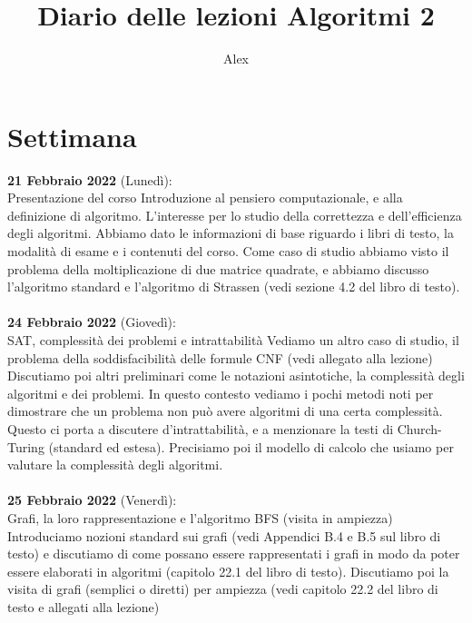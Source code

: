 \documentclass{article}
\title{Diario delle lezioni Algoritmi 2}
\author{Alex}
\begin{document}
\maketitle

\section{Settimana}

\textbf{21 Febbraio 2022} (Lunedì):\\ Presentazione del corso
Introduzione al pensiero computazionale, e alla definizione di algoritmo. L'interesse per lo studio della correttezza e dell'efficienza degli algoritmi.
Abbiamo dato le informazioni di base riguardo i libri di testo, la modalità di esame e i contenuti del corso.
Come caso di studio abbiamo visto il problema della moltiplicazione di due matrice quadrate, e abbiamo discusso l'algoritmo standard e l'algoritmo di Strassen (vedi sezione 4.2 del libro di testo).\\
\\\textbf{24 Febbraio 2022} (Giovedì):\\ SAT, complessità dei problemi e intrattabilità
Vediamo un altro caso di studio, il problema della soddisfacibilità delle formule CNF (vedi allegato alla lezione)
Discutiamo poi altri preliminari come le notazioni asintotiche, la complessità degli algoritmi e dei problemi. In questo contesto vediamo i pochi metodi noti per dimostrare che un problema non può avere algoritmi di una certa complessità. Questo ci porta a discutere d'intrattabilità, e a menzionare la testi di Church-Turing (standard ed estesa). Precisiamo poi il modello di calcolo che usiamo per valutare la complessità degli algoritmi.\\
\\\textbf{25 Febbraio 2022} (Venerdì): \\Grafi, la loro rappresentazione e l'algoritmo BFS (visita in ampiezza)
Introduciamo nozioni standard sui grafi (vedi Appendici B.4 e B.5 sul libro di testo) e discutiamo di come possano essere rappresentati i grafi in modo da poter essere elaborati in algoritmi (capitolo 22.1 del libro di testo).
Discutiamo poi la visita di grafi (semplici o diretti) per ampiezza (vedi capitolo 22.2 del libro di testo e allegati alla lezione)
\end{document}
